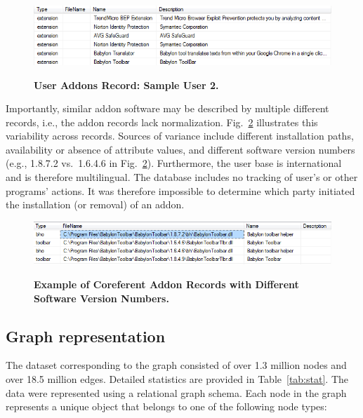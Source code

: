 \documentclass[10pt,letterpaper]{article}
\begin{document}
\begin{figure}[!h]
\caption{{\bf User Addons Record: Sample User 2.}}
\includegraphics[width=\linewidth]{figures/db_addons_snapshot_desc.png}
\label{fig:user2}
\end{figure}

Importantly, similar addon software may be described by multiple different records, i.e., the addon records lack normalization. Fig.~\ref{fig:example} illustrates this variability across records. Sources of variance include different installation paths, availability or absence of attribute values, and different software version numbers (e.g., 1.8.7.2 vs.~1.6.4.6 in Fig.~\ref{fig:example}). Furthermore, the user base is international and is therefore multilingual. The database includes no tracking of user's or other programs' actions. It was therefore impossible to determine which party initiated the installation (or removal) of an addon.  

\begin{figure}[!h]
\caption{{\bf Example of Coreferent Addon Records with Different Software Version Numbers.}}
\includegraphics[width=\linewidth]{figures/addons_versioning_snapshot.png}
\label{fig:example}
\end{figure}

\subsection*{Graph representation}

The dataset corresponding to the graph consisted of over 1.3 million nodes and over 18.5 million edges. Detailed statistics are provided in Table~\ref{tab:stat}. The data were represented using a relational graph schema. Each node in the graph represents a unique object that belongs to one of the following node types:   
\end{document}
